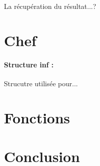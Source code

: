 \documentclass[a4]{article}
\begin{document}
			La récupération du résultat...?\\
			
	\section{Chef}
			\paragraph{Structure inf :\\}
			Strucutre utilisée pour...
			
			
	\section{Fonctions}

	\section{Conclusion}
		
\end{document}

